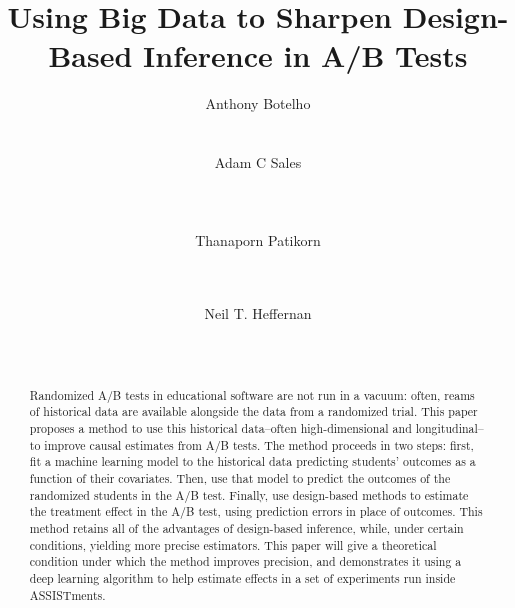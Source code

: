\documentclass{edm_template}
\begin{document}
\title{Using Big Data to Sharpen Design-Based Inference in A/B Tests}

\author{
\alignauthor Anthony Botelho\\
       \\
       \\
\alignauthor Adam C Sales\\
       \\
       \\
       \\
\alignauthor Thanaporn Patikorn\\
       \\
       \\
\and  %
\alignauthor Neil T. Heffernan\\
       \\
       \\
}

\maketitle
\begin{abstract}
Randomized A/B tests in educational software are not run in a vacuum: often, reams of historical data are available alongside the data from a randomized trial. This paper proposes a method to use this historical data--often high-dimensional and longitudinal--to improve causal estimates from A/B tests. The method proceeds in two steps: first, fit a machine learning model to the historical data predicting students' outcomes as a function of their covariates. Then, use that model to predict the outcomes of the randomized students in the A/B test. Finally, use design-based methods to estimate the treatment effect in the A/B test, using prediction errors in place of outcomes. This method retains all of the advantages of design-based inference, while, under certain conditions, yielding more precise estimators. This paper will give a theoretical condition under which the method improves precision, and demonstrates it using a deep learning algorithm to help estimate effects in a set of experiments run inside ASSISTments.
\end{abstract}
\end{document}
